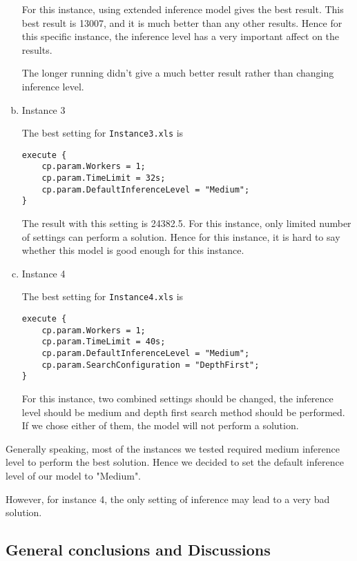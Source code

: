 \documentclass[a4paper, 12pt]{article}
\begin{document}
\begin{enumerate}[a.~]
For this instance, using extended inference model gives the best result. This best result is 13007, and it is much better than any other results. Hence for this specific instance, the inference level has a very important affect on the results. 

The longer running didn't give a much better result rather than changing inference level. 

\item Instance 3

The best setting for \texttt{Instance3.xls} is

\begin{lstlisting}
execute {
    cp.param.Workers = 1;
    cp.param.TimeLimit = 32s; 
    cp.param.DefaultInferenceLevel = "Medium";
}
\end{lstlisting}

The result with this setting is 24382.5. For this instance, only limited number of settings can perform a solution. Hence for this instance, it is hard to say whether this model is good enough for this instance. 

\item Instance 4

The best setting for \texttt{Instance4.xls} is 

\begin{lstlisting}
execute {
    cp.param.Workers = 1;
    cp.param.TimeLimit = 40s; 
    cp.param.DefaultInferenceLevel = "Medium";
    cp.param.SearchConfiguration = "DepthFirst";
}
\end{lstlisting}

For this instance, two combined settings should be changed, the inference level should be medium and depth first search method should be performed. If we chose either of them, the model will not perform a solution. 
\end{enumerate}

Generally speaking, most of the instances we tested required medium inference level to perform the best solution. Hence we decided to set the default inference level of our model to "Medium". 

However, for instance 4, the only setting of inference may lead to a very bad solution. 

\subsection{General conclusions and Discussions}
\end{document}

